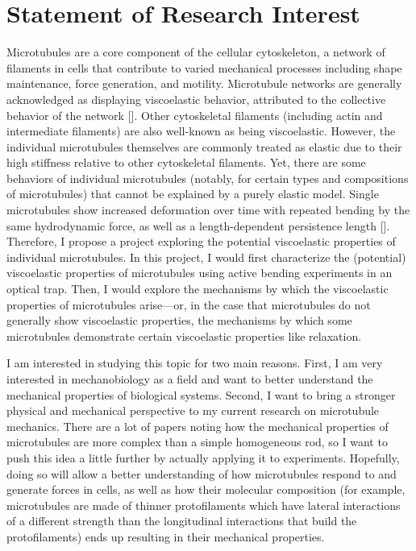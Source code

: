 \documentclass[preprint,12pt,authoryear]{elsarticle}
\begin{document}
% 
\section{Statement of Research Interest}
Microtubules are a core component of the cellular cytoskeleton, a network of filaments in cells that contribute to varied mechanical processes including shape maintenance, force generation, and motility. Microtubule networks are generally acknowledged as displaying viscoelastic behavior, attributed to the collective behavior of the network [\cite{visco_review, visco_MTs}]. Other cytoskeletal filaments (including actin and intermediate filaments) are also well-known as being viscoelastic. However, the individual microtubules themselves are commonly treated as elastic due to their high stiffness relative to other cytoskeletal filaments. Yet, there are some behaviors of individual microtubules (notably, for certain types and compositions of microtubules) that cannot be explained by a purely elastic model. Single microtubules show increased deformation over time with repeated bending by the same hydrodynamic force, as well as a length-dependent persistence length [\cite{acetyl_aging, Celeg_lumen}]. Therefore, I propose a project exploring the potential viscoelastic properties of individual microtubules. In this project, I would first characterize the (potential) viscoelastic properties of microtubules using active bending experiments in an optical trap. Then, I would explore the mechanisms by which the viscoelastic properties of microtubules arise---or, in the case that microtubules do not generally show viscoelastic properties, the mechanisms by which some microtubules demonstrate certain viscoelastic properties like relaxation.

I am interested in studying this topic for two main reasons. First, I am very interested in mechanobiology as a field and want to better understand the mechanical properties of biological systems. Second, I want to bring a stronger physical and mechanical perspective to my current research on microtubule mechanics. There are a lot of papers noting how the mechanical properties of microtubules are more complex than a simple homogeneous rod, so I want to push this idea a little further by actually applying it to experiments. Hopefully, doing so will allow a better understanding of how microtubules respond to and generate forces in cells, as well as how their molecular composition (for example, microtubules are made of thinner protofilaments which have lateral interactions of a different strength than the longitudinal interactions that build the protofilaments) ends up resulting in their mechanical properties.
\end{document}
